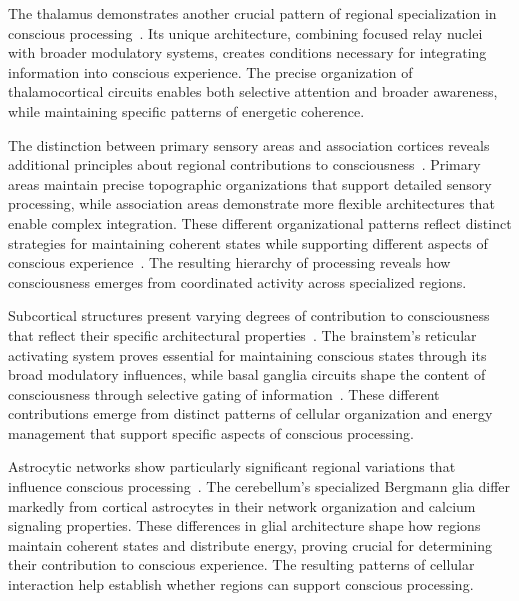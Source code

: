 The thalamus demonstrates another crucial pattern of regional specialization in conscious processing~\cite{pinotsis2023vivo}. Its unique architecture, combining focused relay nuclei with broader modulatory systems, creates conditions necessary for integrating information into conscious experience. The precise organization of thalamocortical circuits enables both selective attention and broader awareness, while maintaining specific patterns of energetic coherence.

The distinction between primary sensory areas and association cortices reveals additional principles about regional contributions to consciousness~\cite{Gidon2020}. Primary areas maintain precise topographic organizations that support detailed sensory processing, while association areas demonstrate more flexible architectures that enable complex integration. These different organizational patterns reflect distinct strategies for maintaining coherent states while supporting different aspects of conscious experience~\cite{Smith2013}. The resulting hierarchy of processing reveals how consciousness emerges from coordinated activity across specialized regions.

Subcortical structures present varying degrees of contribution to consciousness that reflect their specific architectural properties~\cite{zheng2025unbearable}. The brainstem's reticular activating system proves essential for maintaining conscious states through its broad modulatory influences, while basal ganglia circuits shape the content of consciousness through selective gating of information~\cite{bosl2025dynamical}. These different contributions emerge from distinct patterns of cellular organization and energy management that support specific aspects of conscious processing.

Astrocytic networks show particularly significant regional variations that influence conscious processing~\cite{pellerin2004neuroenergetics}. The cerebellum's specialized Bergmann glia differ markedly from cortical astrocytes in their network organization and calcium signaling properties. These differences in glial architecture shape how regions maintain coherent states and distribute energy, proving crucial for determining their contribution to conscious experience. The resulting patterns of cellular interaction help establish whether regions can support conscious processing.

